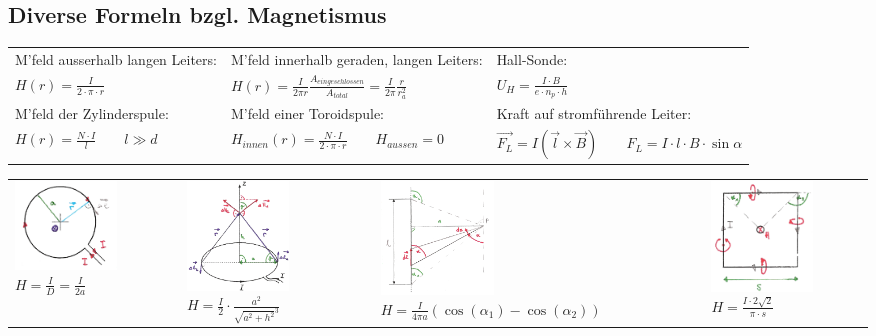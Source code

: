 \subsection{Diverse Formeln bzgl. Magnetismus}
\renewcommand{\arraystretch}{1.1}
\begin{tabular}[c]{|l|l|l|}
\hline
M'feld ausserhalb langen Leiters:
	& M'feld innerhalb geraden, langen Leiters: 
	& Hall-Sonde:\\
$H(r) = \frac{I}{2 \cdot \pi \cdot r}$
	&$H(r) = \frac{I}{2 \pi r} \frac{A_{eingeschlossen}}{A_{total}} = 
	 \frac{I}{2 \pi} \frac{r}{r_a^2}$
	& $U_H = \frac{I \cdot B}{e \cdot n_p \cdot h}$\\
\hline
M'feld der Zylinderspule:
	&M'feld einer Toroidspule:
	&Kraft auf stromführende Leiter:\\
$H(r) = \frac{N \cdot I}{l} \qquad l \gg d$
	& $H_{innen}(r) = \frac{N \cdot I}{2 \cdot \pi \cdot r} \qquad H_{aussen} = 0$
	&$\vec{F_L} = I (\vec{l} \times \vec{B}) \qquad F_L = I \cdot l \cdot B \cdot
	\sin{\alpha}$ \\
\hline
\end{tabular}
\renewcommand{\arraystretch}{1}

\begin{tabular}{llll}
\parbox{4.5cm}{
	\includegraphics[width=2.7cm]{./bilder/biot1.png} \\
	$H =\frac{I}{D} = \frac{I}{2a}$}
& \parbox{4.5cm}{
	\includegraphics[width=2.7cm]{./bilder/biot2.png} \\
	$H=\frac{I}{2} \cdot \frac{a^2}{\sqrt{a^2+h^2}^3}$}
& \parbox{4.5cm}{
	\includegraphics[width=3cm]{./bilder/biot3.png} \\
	$H=\frac{I}{4\pi a}(\cos(\alpha_1)- \cos(\alpha_2))$}
& \parbox{4.5cm}{
	\includegraphics[width=2.7cm]{./bilder/biot4.png} \\
	$H= \frac{I \cdot 2 \sqrt{2}}{\pi \cdot s}$ }
\end{tabular}

